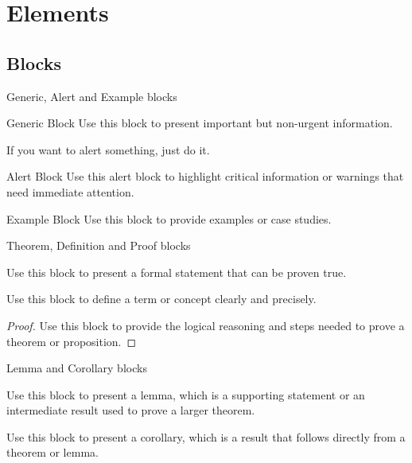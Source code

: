 
\section{Elements}

\subsection{Blocks}

\begin{frame}{Generic, Alert and Example blocks}
	\begin{block}{Generic Block}
		Use this block to present important but non-urgent information. \cite{donnelly1997}
	\end{block}

	If you want to alert something, \alert{just do it}.
	\begin{alertblock}{Alert Block}
		Use this alert block to highlight critical information or warnings that need immediate attention. \cite{chen2012}
	\end{alertblock}

	\begin{exampleblock}{Example Block}
		Use this block to provide examples or case studies. \cite{bredillet2018}
	\end{exampleblock}
\end{frame}

\begin{frame}{Theorem, Definition and Proof blocks}
	\begin{theorem}
		Use this block to present a formal statement that can be proven true. \cite{basl2002}
	\end{theorem}

	\begin{definition}
		Use this block to define a term or concept clearly and precisely. \cite{bach2017}
	\end{definition}

	\begin{proof}
		Use this block to provide the logical reasoning and steps needed to prove a theorem or proposition.
	\end{proof}
\end{frame}

\begin{frame}{Lemma and Corollary blocks}
	\begin{lemma}
		Use this block to present a lemma, which is a supporting statement or an intermediate result used to prove a larger theorem.
	\end{lemma}

	\begin{corollary}
		Use this block to present a corollary, which is a result that follows directly from a theorem or lemma.
	\end{corollary}
\end{frame}

